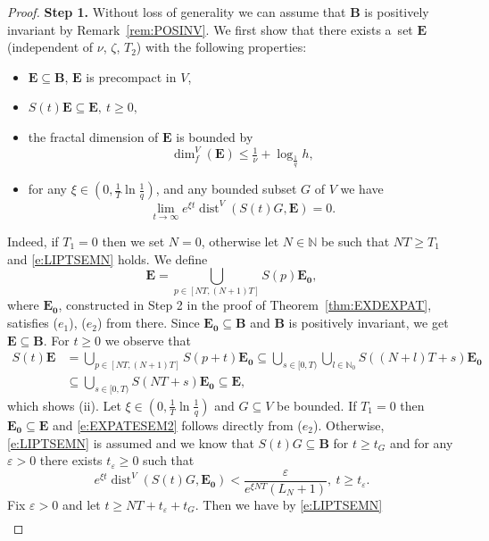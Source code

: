 \documentclass[a4paper,12pt,reqno]{amsart}
\theoremstyle{plain}
\theoremstyle{definition}
\numberwithin{equation}{section}
\newcommand{\N}{\mathbb{N}}
\newcommand{\eps}{\varepsilon}
\newcommand{\dist}{\operatorname{dist}}
\newcommand{\dimf}{\operatorname{dim}_{f}}
\renewcommand{\geq}{\geqslant}
\renewcommand{\leq}{\leqslant}
\begin{document}
\begin{proof}
\textbf{Step 1.} Without loss of generality we can assume that $\mathbf{B}$ is positively invariant by Remark~\ref{rem:POSINV}. We first show that there exists a~set $\mathbf{E}$ (independent of $\nu$, $\zeta$, $T_2$) with the following properties:
\begin{itemize}
\item[(i)] $\mathbf{E}\subseteq\mathbf{B}$, $\mathbf{E}$ is precompact in $V$,
\item[(ii)] $S(t)\mathbf{E}\subseteq\mathbf{E},\ t\geq 0,$
\item[(iii)] the fractal dimension of $\mathbf{E}$ is bounded by
\begin{equation*}
\dimf^{V}(\mathbf{E})\leq\tfrac{1}{\nu}+\log_{\frac{1}{q}}h,
\end{equation*}
\item[(iv)] for any $\xi\in(0,\frac{1}{T}\ln\frac{1}{q})$,
and any bounded subset $G$ of $V$ we have
\begin{equation}\label{e:EXPATESEM2}
\lim_{t\rightarrow\infty}e^{\xi t}\dist^{V}(S(t)G,\mathbf{E})=0.
\end{equation}
\end{itemize}
Indeed, if $T_1=0$ then we set $N=0$, otherwise let $N\in\N$ be such that $NT\geq T_1$
and \eqref{e:LIPTSEMN} holds. We define
$$\mathbf{E}=\bigcup_{p\in[NT,(N+1)T]}S(p)\mathbf{E_0},$$
where $\mathbf{E_0}$, constructed in Step 2 in the proof of Theorem~\ref{thm:EXDEXPAT}, satisfies ($e_1$), ($e_2$) from there. Since $\mathbf{E_0}\subseteq \mathbf{B}$
and $\mathbf{B}$ is positively invariant, we get $\mathbf{E}\subseteq \mathbf{B}$. For $t\geq 0$ we observe that
\begin{align*}
S(t)\mathbf{E}&=\bigcup_{p\in[NT,(N+1)T]}S(p+t)\mathbf{E_0}\subseteq\bigcup_{s\in[0,T)}\bigcup_{l\in\N_0}S((N+l)T+s)\mathbf{E_0}\\
&\subseteq\bigcup_{s\in[0,T)}S(NT+s)\mathbf{E_0}\subseteq\mathbf{E},
\end{align*}
which shows (ii).
Let $\xi\in(0,\frac{1}{T}\ln\frac{1}{q})$ and $G\subseteq V$ be bounded.
If $T_1=0$ then $\mathbf{E_0}\subseteq\mathbf{E}$ and \eqref{e:EXPATESEM2} follows directly from
($e_2$). Otherwise, \eqref{e:LIPTSEMN} is assumed and we
know that $S(t)G\subseteq\mathbf{B}$ for $t\geq t_{G}$ and for any $\eps>0$ there exists $t_\eps\geq 0$
such that
$$e^{\xi t}\dist^{V}(S(t)G,\mathbf{E_0})<\frac{\eps}{e^{\xi NT}(L_{N}+1)},\ t\geq t_\eps.$$
Fix $\eps>0$ and let $t\geq NT+t_\eps+t_{G}$. Then we have by \eqref{e:LIPTSEMN}
\begin{align*}

\end{align*}
\end{proof}
\end{document}
